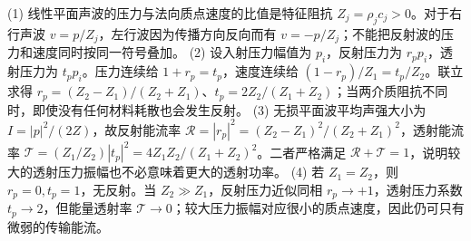 (1) 线性平面声波的压力与法向质点速度的比值是特征阻抗 \(Z_j=\rho_jc_j>0\)。对于右行声波 \(v=p/Z_j\)，左行波因为传播方向反向而有 \(v=-p/Z_j\)；不能把反射波的压力和速度同时按同一符号叠加。
(2) 设入射压力幅值为 \(p_i\)，反射压力为 \(r_p p_i\)，透射压力为 \(t_pp_i\)。压力连续给 \(1+r_p=t_p\)，速度连续给 \((1-r_p)/Z_1=t_p/Z_2\)。联立求得 \(r_p=(Z_2-Z_1)/(Z_2+Z_1)\)、\(t_p=2Z_2/(Z_1+Z_2)\)；当两介质阻抗不同时，即使没有任何材料耗散也会发生反射。
(3) 无损平面波平均声强大小为 \(I=|p|^2/(2Z)\)，故反射能流率 \(\mathcal R=|r_p|^2=(Z_2-Z_1)^2/(Z_2+Z_1)^2\)，透射能流率 \(\mathcal T=(Z_1/Z_2)|t_p|^2=4Z_1Z_2/(Z_1+Z_2)^2\)。二者严格满足 \(\mathcal R+\mathcal T=1\)，说明较大的透射压力振幅也不必意味着更大的透射功率。
(4) 若 \(Z_1=Z_2\)，则 \(r_p=0,t_p=1\)，无反射。当 \(Z_2\gg Z_1\)，反射压力近似同相 \(r_p\to+1\)，透射压力系数 \(t_p\to2\)，但能量透射率 \(\mathcal T\to0\)；较大压力振幅对应很小的质点速度，因此仍可只有微弱的传输能流。
